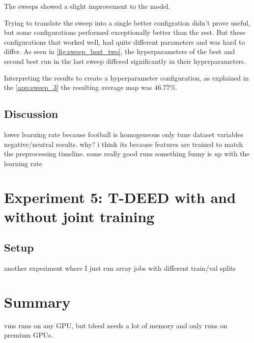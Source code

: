 The sweeps showed a slight improvement to the model. 

Trying to translate the sweep into a single better configration didn't prove useful, but some configurations performed exceptionally better than the rest. But these configurations that worked well, had quite different parameters and was hard to differ. As seen in \autoref{fig:sweep_best_two}, the hyperparameters of the best and second best run in the last sweep differed significantly in their hyperparameters. 

Interpreting the results to create a hyperparameter configuration, as explained in the \autoref{app:sweep_3} the resulting average \acrshort{map} was \(46.77\%\). 

\subsection{Discussion}
\label{ssec:ex4_discussion}
lower learning rate because football is homogeneous
only tune dataset variables
negative/neutral results. why? i think its because features are trained to match the preprocessing timeline. some really good runs
something funny is up with the learning rate



\section{Experiment 5: T-DEED with and without joint training}
\subsection{Setup}
\label{ssec:ex5_setup}

another experiment where I just run array jobs with different train/val splits

\section{Summary}
vms runs on any GPU, but tdeed needs a lot of memory and only runs on premium GPUs.
